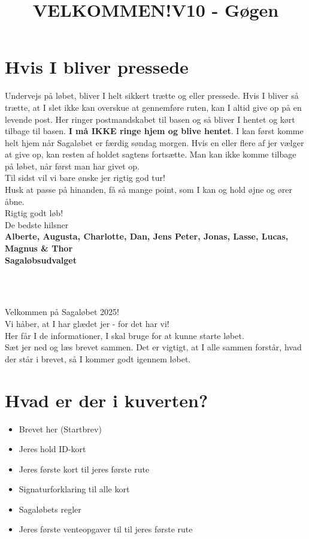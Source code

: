 \section{Hvis I bliver pressede}
Undervejs på løbet, bliver I helt sikkert trætte og eller pressede. Hvis I bliver så trætte, at I slet ikke kan overskue at gennemføre ruten, kan I altid give op på en levende post. Her ringer postmandskabet til basen og så bliver I hentet og kørt tilbage til basen. \textbf{I må IKKE ringe hjem og blive hentet}. I kan først komme helt hjem når Sagaløbet er færdig søndag morgen. Hvis en eller flere af jer vælger at give op, kan resten af holdet sagtens fortsætte. Man kan ikke komme tilbage på løbet, når først man har givet op.\\
\newline
Til sidst vil vi bare ønske jer rigtig god tur!\\
Husk at passe på hinanden, få så mange point, som I kan og hold øjne og ører åbne.\\
\newline
Rigtig godt løb!\\
\newline
\textcolor{søblå}{De bedste hilsner}\\
\textcolor{natblå}{\textbf{Alberte, Augusta, Charlotte, Dan, Jens Peter, Jonas, Lasse, Lucas, Magnus \& Thor}}\\
\textcolor{natblå}{\textbf{Sagaløbsudvalget}}\\
\newpage
\title{VELKOMMEN!}\\
\newline
\title{\textcolor{søblå}{V10 - Gøgen }}\\
\newline
Velkommen på Sagaløbet 2025!\\
Vi håber, at I har glædet jer - for det har vi!\\
Her får I de informationer, I skal bruge for at kunne starte løbet.\\
Sæt jer ned og læs brevet sammen. Det er vigtigt, at I alle sammen forstår, hvad der står i brevet, så I kommer godt igennem løbet.
\section{Hvad er der i kuverten?}
\begin{itemize}
    \item Brevet her (Startbrev)
    \item Jeres hold ID-kort
    \item Jeres første kort til jeres første rute
    \item Signaturforklaring til alle kort
    \item Sagaløbets regler
    \item Jeres første venteopgaver til til jeres første rute
\end{itemize}
